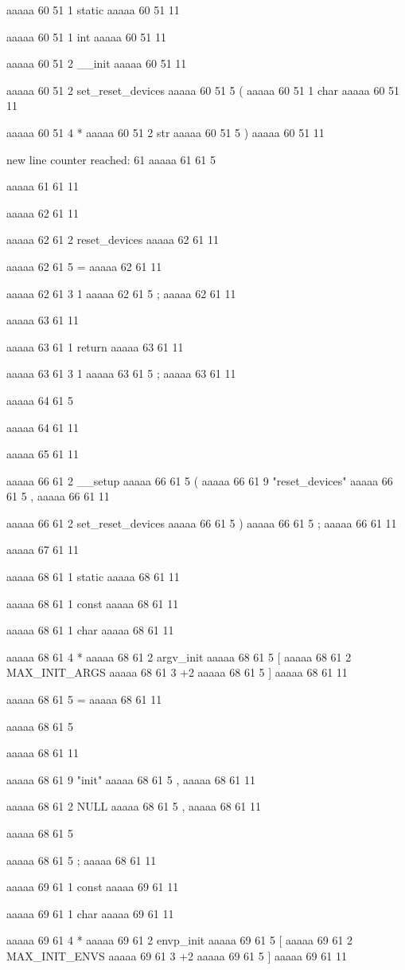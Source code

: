 aaaaa 60 51
1
static
aaaaa 60 51
11
 
aaaaa 60 51
1
int
aaaaa 60 51
11
 
aaaaa 60 51
2
__init
aaaaa 60 51
11
 
aaaaa 60 51
2
set_reset_devices
aaaaa 60 51
5
(
aaaaa 60 51
1
char
aaaaa 60 51
11
 
aaaaa 60 51
4
*
aaaaa 60 51
2
str
aaaaa 60 51
5
)
aaaaa 60 51
11


new line counter reached: 61
aaaaa 61 61
5
{
aaaaa 61 61
11


aaaaa 62 61
11
	
aaaaa 62 61
2
reset_devices
aaaaa 62 61
11
 
aaaaa 62 61
5
=
aaaaa 62 61
11
 
aaaaa 62 61
3
1
aaaaa 62 61
5
;
aaaaa 62 61
11


aaaaa 63 61
11
	
aaaaa 63 61
1
return
aaaaa 63 61
11
 
aaaaa 63 61
3
1
aaaaa 63 61
5
;
aaaaa 63 61
11


aaaaa 64 61
5
}
aaaaa 64 61
11


aaaaa 65 61
11


aaaaa 66 61
2
__setup
aaaaa 66 61
5
(
aaaaa 66 61
9
"reset_devices"
aaaaa 66 61
5
,
aaaaa 66 61
11
 
aaaaa 66 61
2
set_reset_devices
aaaaa 66 61
5
)
aaaaa 66 61
5
;
aaaaa 66 61
11


aaaaa 67 61
11


aaaaa 68 61
1
static
aaaaa 68 61
11
 
aaaaa 68 61
1
const
aaaaa 68 61
11
 
aaaaa 68 61
1
char
aaaaa 68 61
11
 
aaaaa 68 61
4
*
aaaaa 68 61
2
argv_init
aaaaa 68 61
5
[
aaaaa 68 61
2
MAX_INIT_ARGS
aaaaa 68 61
3
+2
aaaaa 68 61
5
]
aaaaa 68 61
11
 
aaaaa 68 61
5
=
aaaaa 68 61
11
 
aaaaa 68 61
5
{
aaaaa 68 61
11
 
aaaaa 68 61
9
"init"
aaaaa 68 61
5
,
aaaaa 68 61
11
 
aaaaa 68 61
2
NULL
aaaaa 68 61
5
,
aaaaa 68 61
11
 
aaaaa 68 61
5
}
aaaaa 68 61
5
;
aaaaa 68 61
11


aaaaa 69 61
1
const
aaaaa 69 61
11
 
aaaaa 69 61
1
char
aaaaa 69 61
11
 
aaaaa 69 61
4
*
aaaaa 69 61
2
envp_init
aaaaa 69 61
5
[
aaaaa 69 61
2
MAX_INIT_ENVS
aaaaa 69 61
3
+2
aaaaa 69 61
5
]
aaaaa 69 61
11
 
